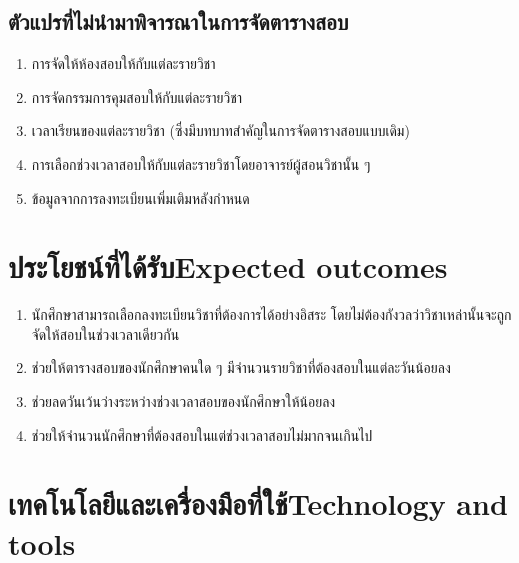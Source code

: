 \subsection{ตัวแปรที่ไม่นำมาพิจารณาในการจัดตารางสอบ}
\begin{enumerate}
    \item การจัดให้ห้องสอบให้กับแต่ละรายวิชา
    \item การจัดกรรมการคุมสอบให้กับแต่ละรายวิชา
    \item เวลาเรียนของแต่ละรายวิชา (ซึ่งมีบทบาทสำคัญในการจัดตารางสอบแบบเดิม)
    \item การเลือกช่วงเวลาสอบให้กับแต่ละรายวิชาโดยอาจารย์ผู้สอนวิชานั้น ๆ
    \item ข้อมูลจากการลงทะเบียนเพิ่มเติมหลังกำหนด
\end{enumerate}

\section{\ifcpe ประโยชน์ที่ได้รับ\else Expected outcomes\fi}
\begin{enumerate}
    \item นักศึกษาสามารถเลือกลงทะเบียนวิชาที่ต้องการได้อย่างอิสระ โดยไม่ต้องกังวลว่าวิชาเหล่านั้นจะถูกจัดให้สอบในช่วงเวลาเดียวกัน
    \item ช่วยให้ตารางสอบของนักศึกษาคนใด ๆ มีจำนวนรายวิชาที่ต้องสอบในแต่ละวันน้อยลง
    \item ช่วยลดวันเว้นว่างระหว่างช่วงเวลาสอบของนักศึกษาให้น้อยลง
    \item ช่วยให้จำนวนนักศึกษาที่ต้องสอบในแต่ช่วงเวลาสอบไม่มากจนเกินไป
\end{enumerate}

\section{\ifcpe เทคโนโลยีและเครื่องมือที่ใช้\else Technology and tools\fi}


